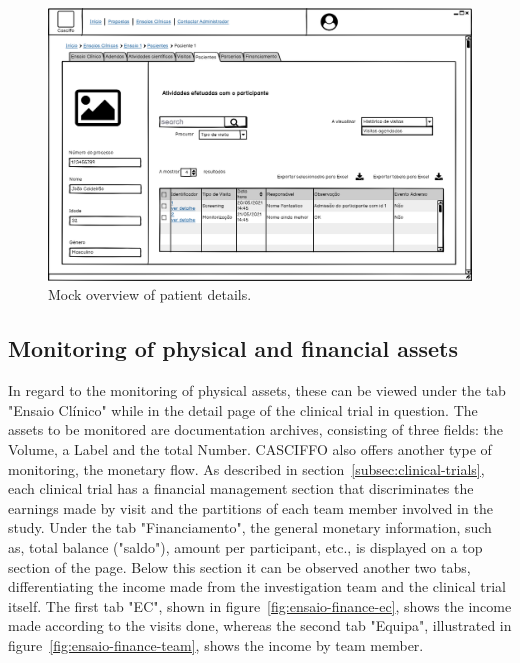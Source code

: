 \begin{figure}[H]
    \centering
    \includegraphics[scale=0.35]{Chapters/img/ensaios/ensaio-paciente-detalhes.png}
    \caption{Mock overview of patient details.}
    \label{fig:ensaio-paciente-detalhes}
\end{figure}

\subsection{Monitoring of physical and financial assets} 
In regard to the monitoring of physical assets, these can be viewed under the tab "Ensaio Clínico" while in the detail page of the clinical trial in question. The assets to be monitored are documentation archives, consisting of three fields: the Volume, a Label and the total Number.
CASCIFFO also offers another type of monitoring, the monetary flow. As described in section~\ref{subsec:clinical-trials}, each clinical trial has a financial management section that discriminates the earnings made by visit and the partitions of each team member involved in the study.  
Under the tab "Financiamento", the general monetary information, such as, total balance ("saldo"), amount per participant, etc., is displayed on a top section of the page. Below this section it can be observed another two tabs, differentiating the income made from the investigation team and the clinical trial itself. The first tab "EC", shown in figure~\ref{fig:ensaio-finance-ec}, shows the income made according to the visits done, whereas the second tab "Equipa", illustrated in figure~\ref{fig:ensaio-finance-team}, shows the income by team member.

